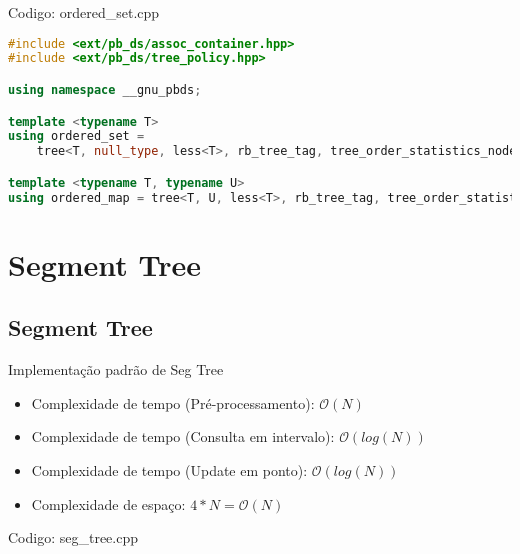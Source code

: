 \documentclass[10pt, a4paper, oneside]{book}
\begin{document}
Codigo: ordered\_set.cpp

\begin{lstlisting}[language=C++]
#include <ext/pb_ds/assoc_container.hpp>
#include <ext/pb_ds/tree_policy.hpp>

using namespace __gnu_pbds;

template <typename T>
using ordered_set =
    tree<T, null_type, less<T>, rb_tree_tag, tree_order_statistics_node_update>;

template <typename T, typename U>
using ordered_map = tree<T, U, less<T>, rb_tree_tag, tree_order_statistics_node_update>;\end{lstlisting}
\hfill

\section{Segment Tree}
\subsection{Segment Tree}
Implementação padrão de Seg Tree



\begin{itemize}
\item Complexidade de tempo (Pré-processamento): $\mathcal{O}(N)$
\item Complexidade de tempo (Consulta em intervalo): $\mathcal{O}(log(N))$
\item Complexidade de tempo (Update em ponto): $\mathcal{O}(log(N))$
\item Complexidade de espaço: $4 * N = \mathcal{O}(N)$
\end{itemize}

\hfill

Codigo: seg\_tree.cpp
\end{document}
